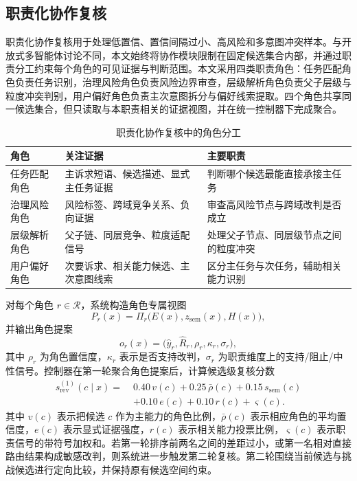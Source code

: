 \documentclass[10pt,a4paper,twocolumn,fontset=fandol]{ctexart}
\begin{document}
\subsection{职责化协作复核}

职责化协作复核用于处理低置信、置信间隔过小、高风险和多意图冲突样本。与开放式多智能体讨论不同，本文始终将协作模块限制在固定候选集合内部，并通过职责分工约束每个角色的可见证据与判断范围。本文采用四类职责角色：任务匹配角色负责任务识别，治理风险角色负责风险边界审查，层级解析角色负责父子层级与粒度冲突判别，用户偏好角色负责主次意图拆分与偏好线索提取。四个角色共享同一候选集合，但只读取与本职责相关的证据视图，并在统一控制器下完成聚合。

\begin{table}[htbp]
\centering
\caption{职责化协作复核中的角色分工}
\label{tab:roles}
\small
\begin{tabularx}{\columnwidth}{lYY}
\toprule
角色 & 关注证据 & 主要职责 \\
\midrule
任务匹配角色 & 主诉求短语、候选描述、显式主任务证据 & 判断哪个候选最能直接承接主任务 \\
治理风险角色 & 风险标签、跨域竞争关系、负向证据 & 审查高风险节点与跨域改判是否成立 \\
层级解析角色 & 父子链、同层竞争、粒度适配信号 & 处理父子节点、同层级节点之间的粒度冲突 \\
用户偏好角色 & 次要诉求、相关能力候选、主次意图线索 & 区分主任务与次任务，辅助相关能力识别 \\
\bottomrule
\end{tabularx}
\end{table}

对每个角色 $r\in\mathcal R$，系统构造角色专属视图
\begin{equation}
P_r(x)=\Pi_r\bigl(E(x),z_{\mathrm{sem}}(x),H(x)\bigr),
\end{equation}
并输出角色提案
\begin{equation}
o_r(x)=\bigl(\hat y_r,\hat R_r,\rho_r,\kappa_r,\sigma_r\bigr),
\end{equation}
其中 $\rho_r$ 为角色置信度，$\kappa_r$ 表示是否支持改判，$\sigma_r$ 为职责维度上的支持/阻止/中性信号。控制器在第一轮聚合角色提案后，计算候选级复核分数
\begin{equation}
\begin{aligned}
s_{\mathrm{rev}}^{(1)}(c\mid x)=\;&0.40\,v(c)
+0.25\,\bar{\rho}(c)
+0.15\,s_{\mathrm{sem}}(c)\\
&+0.10\,e(c)
+0.10\,r(c)
+\varsigma(c).
\end{aligned}
\end{equation}
其中 $v(c)$ 表示把候选 $c$ 作为主能力的角色比例，$\bar{\rho}(c)$ 表示相应角色的平均置信度，$e(c)$ 表示显式证据强度，$r(c)$ 表示相关能力投票比例，$\varsigma(c)$ 表示职责信号的带符号加权和。若第一轮排序前两名之间的差距过小，或第一名相对直接路由结果构成敏感改判，则系统进一步触发第二轮复核。第二轮围绕当前候选与挑战候选进行定向比较，并保持原有候选空间约束。
\end{document}
